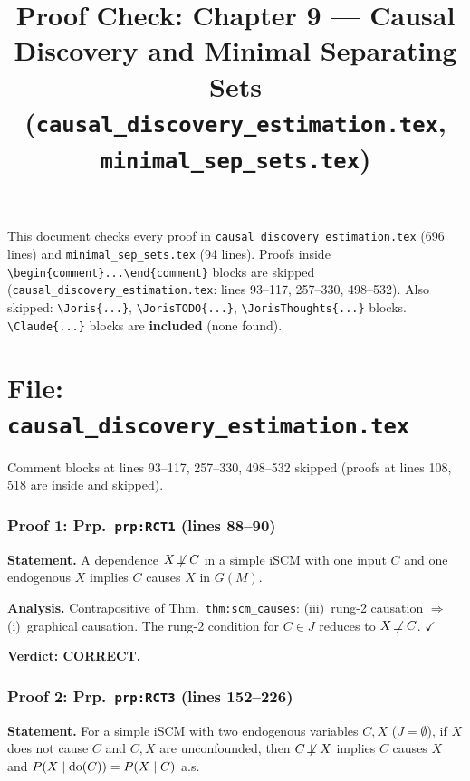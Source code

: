 \documentclass{article}
\title{Proof Check: Chapter 9 --- Causal Discovery and Minimal Separating Sets\\
(\texttt{causal\_discovery\_estimation.tex}, \texttt{minimal\_sep\_sets.tex})}
\date{}
\begin{document}
\maketitle

This document checks every proof in \texttt{causal\_discovery\_estimation.tex}
(696 lines) and \texttt{minimal\_sep\_sets.tex} (94 lines).
Proofs inside \verb|\begin{comment}...\end{comment}| blocks are skipped
(\texttt{causal\_discovery\_estimation.tex}: lines 93--117, 257--330, 498--532).
Also skipped: \verb|\Joris{...}|, \verb|\JorisTODO{...}|,
\verb|\JorisThoughts{...}| blocks.
\verb|\Claude{...}| blocks are \textbf{included} (none found).

\part*{File: \texttt{causal\_discovery\_estimation.tex}}

Comment blocks at lines 93--117, 257--330, 498--532 skipped
(proofs at lines 108, 518 are inside and skipped).

\section{Proof 1: Prp.\ \texttt{prp:RCT1} (lines 88--90)}

\textbf{Statement.} A dependence $X\not\!\perp C$ in a simple iSCM with
one input $C$ and one endogenous $X$ implies $C$ causes $X$ in $G(M)$.

\textbf{Analysis.}
Contrapositive of Thm.\ \texttt{thm:scm\_causes}:
(iii)~rung-2 causation $\Rightarrow$ (i)~graphical causation.
The rung-2 condition for $C\in J$ reduces to $X\not\!\perp C$.  $\checkmark$

\textbf{Verdict: CORRECT.}

\section{Proof 2: Prp.\ \texttt{prp:RCT3} (lines 152--226)}

\textbf{Statement.} For a simple iSCM with two endogenous variables $C,X$
($J=\emptyset$), if $X$ does not cause $C$ and $C,X$ are unconfounded,
then $C\not\!\perp X$ implies $C$ causes $X$ and
$P(X\mid\operatorname{do}(C))=P(X\mid C)$ a.s.
\end{document}
